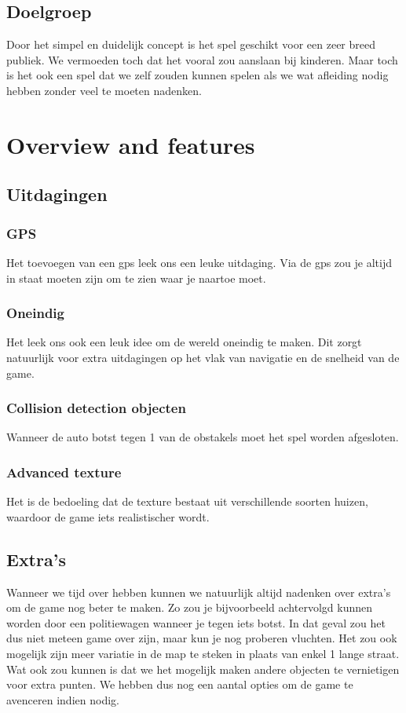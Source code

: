 \documentclass{article}
\begin{document}
\subsection{Doelgroep}
Door het simpel en duidelijk concept is het spel geschikt voor een zeer breed publiek. We vermoeden toch dat het vooral zou aanslaan 
bij kinderen. Maar toch is het ook een spel dat we zelf zouden kunnen spelen als we wat afleiding nodig hebben zonder veel te moeten 
nadenken.
\section{Overview and features}
\subsection{Uitdagingen}

\subsubsection{GPS}
Het toevoegen van een gps leek ons een leuke uitdaging. Via de gps zou je altijd in staat moeten zijn om te zien waar je naartoe moet.
\subsubsection{Oneindig}
Het leek ons ook een leuk idee om de wereld oneindig te maken. Dit zorgt natuurlijk voor extra uitdagingen op het vlak van navigatie en 
de snelheid van de game.
\subsubsection{Collision detection objecten}
Wanneer de auto botst tegen 1 van de obstakels moet het spel worden afgesloten.
\subsubsection{Advanced texture}
Het is de bedoeling dat de texture bestaat uit verschillende soorten huizen, waardoor de game iets realistischer wordt.


\subsection{Extra's}
Wanneer we tijd over hebben kunnen we natuurlijk altijd nadenken over extra's om de game nog beter te maken. Zo zou je bijvoorbeeld 
achtervolgd kunnen worden door een politiewagen wanneer je tegen iets botst. In dat geval zou het dus niet meteen game over zijn, 
maar kun je nog proberen vluchten. Het zou ook mogelijk zijn meer variatie in de map te steken in plaats van enkel 1 lange straat. 
Wat ook zou kunnen is dat we het mogelijk maken andere objecten te vernietigen voor extra punten. We hebben dus nog een aantal opties 
om de game te avenceren indien nodig.
\end{document}
